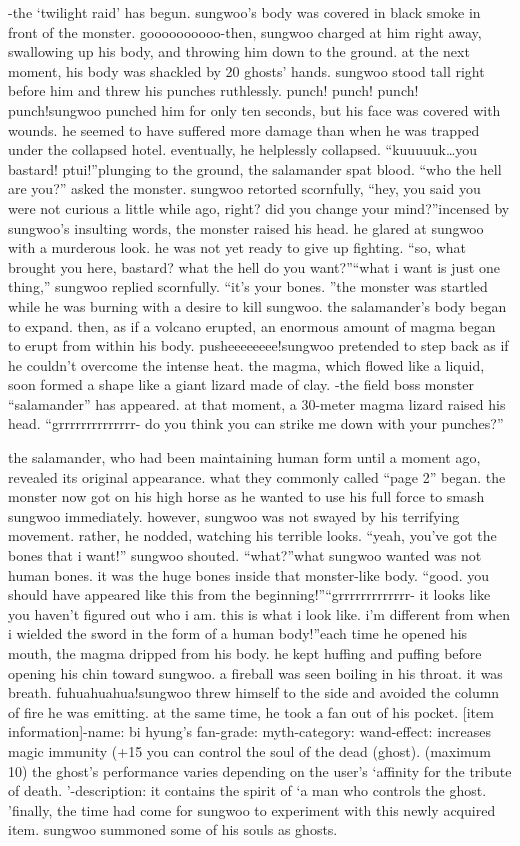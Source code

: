 -the ‘twilight raid’ has begun.
sungwoo’s body was covered in black smoke in front of the monster.
goooooooooo-then, sungwoo charged at him right away, swallowing up his body, and throwing him down to the ground.
at the next moment, his body was shackled by 20 ghosts’ hands.
 sungwoo stood tall right before him and threw his punches ruthlessly.
punch! punch! punch! punch!sungwoo punched him for only ten seconds, but his face was covered with wounds.
 he seemed to have suffered more damage than when he was trapped under the collapsed hotel.
eventually, he helplessly collapsed.
“kuuuuuk…you bastard! ptui!”plunging to the ground, the salamander spat blood.
“who the hell are you?” asked the monster.
sungwoo retorted scornfully, “hey, you said you were not curious a little while ago, right? did you change your mind?”incensed by sungwoo’s insulting words, the monster raised his head.
 he glared at sungwoo with a murderous look.
 he was not yet ready to give up fighting.
“so, what brought you here, bastard? what the hell do you want?”“what i want is just one thing,” sungwoo replied scornfully.
 “it’s your bones.
”the monster was startled while he was burning with a desire to kill sungwoo.
the salamander’s body began to expand.
 then, as if a volcano erupted, an enormous amount of magma began to erupt from within his body.
pusheeeeeeee!sungwoo pretended to step back as if he couldn’t overcome the intense heat.
the magma, which flowed like a liquid, soon formed a shape like a giant lizard made of clay.
-the field boss monster “salamander” has appeared.
at that moment, a 30-meter magma lizard raised his head.
“grrrrrrrrrrrrrr- do you think you can strike me down with your punches?”

the salamander, who had been maintaining human form until a moment ago, revealed its original appearance.
 what they commonly called “page 2” began.
 the monster now got on his high horse as he wanted to use his full force to smash sungwoo immediately.
however, sungwoo was not swayed by his terrifying movement.
rather, he nodded, watching his terrible looks.
“yeah, you’ve got the bones that i want!” sungwoo shouted.
“what?”what sungwoo wanted was not human bones.
 it was the huge bones inside that monster-like body.
“good.
 you should have appeared like this from the beginning!”“grrrrrrrrrrrrr- it looks like you haven’t figured out who i am.
 this is what i look like.
 i’m different from when i wielded the sword in the form of a human body!”each time he opened his mouth, the magma dripped from his body.
 he kept huffing and puffing before opening his chin toward sungwoo.
 a fireball was seen boiling in his throat.
it was breath.
fuhuahuahua!sungwoo threw himself to the side and avoided the column of fire he was emitting.
at the same time, he took a fan out of his pocket.
[item information]-name: bi hyung’s fan-grade: myth-category: wand-effect: increases magic immunity (+15%
 you can control the soul of the dead (ghost).
 (maximum 10) the ghost’s performance varies depending on the user’s ‘affinity for the tribute of death.
’-description: it contains the spirit of ‘a man who controls the ghost.
’finally, the time had come for sungwoo to experiment with this newly acquired item.
 sungwoo summoned some of his souls as ghosts.


 